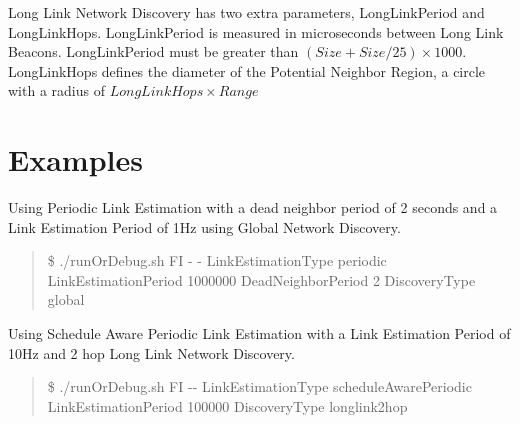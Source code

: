 Long Link Network Discovery has two extra parameters, LongLinkPeriod and LongLinkHops. LongLinkPeriod is measured in microseconds between Long Link Beacons. LongLinkPeriod must be greater than $(Size + Size/25) \times 1000$. LongLinkHops defines the diameter of the Potential Neighbor Region, a circle with a radius of $LongLinkHops \times Range$

\section{Examples}

Using Periodic Link Estimation with a dead neighbor period of 2 seconds and a Link Estimation Period of 1Hz using Global Network Discovery.

\begin{quote}
	\$ ./runOrDebug.sh FI - - LinkEstimationType periodic LinkEstimationPeriod 1000000 DeadNeighborPeriod 2 DiscoveryType global\\
\end{quote}

Using Schedule Aware Periodic Link Estimation with a Link Estimation Period of 10Hz and 2 hop Long Link Network Discovery.

\begin{quote}
       \$ ./runOrDebug.sh FI -\mbox{}- LinkEstimationType
scheduleAwarePeriodic LinkEstimationPeriod 100000 DiscoveryType longlink2hop
\end{quote}

